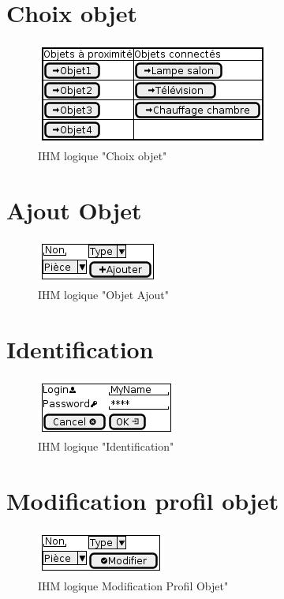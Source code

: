\documentclass[10pt,a4paper]{report}
\begin{document}
		\section{Choix objet}

\begin{figure}[H]
	\centering
	\includegraphics[scale=0.55]{Choix_objet}
	\caption{IHM logique "Choix objet"}
	\label{ihmLogiqueChoixObjet}
\end{figure}

		\section{Ajout Objet}

\begin{figure}[H]
	\centering
	\includegraphics[scale=0.55]{Objet_Ajout}
	\caption{IHM logique "Objet Ajout"}
	\label{ihmLogiqueObjetAjout}
\end{figure}

		\section{Identification}

\begin{figure}[H]
	\centering
	\includegraphics[scale=0.55]{Identification}
	\caption{IHM logique "Identification"}
	\label{ihmLogiqueIdentification}
\end{figure}

		\section{Modification profil objet}

\begin{figure}[H]
	\centering
	\includegraphics[scale=0.55]{Objet_profil_modif}
	\caption{IHM logique Modification Profil Objet"}
	\label{ihmLogiqueObjProModif}
\end{figure}
\end{document}
